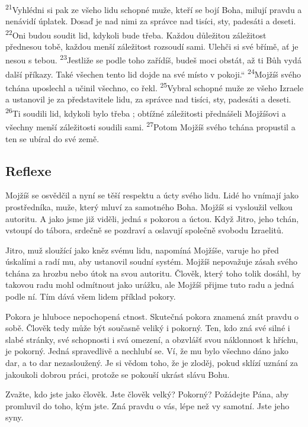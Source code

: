 \documentclass[11pt]{article}
\begin{document}
{\textsuperscript{21}Vyhlédni si pak ze všeho lidu schopné muže, kteří se bojí Boha, milují pravdu a nenávidí úplatek. Dosaď je nad nimi za správce nad tisíci, sty, padesáti a deseti.
\textsuperscript{22}Oni budou soudit lid, kdykoli bude třeba. Každou důležitou záležitost přednesou tobě, každou menší záležitost rozsoudí sami. Ulehči si své břímě, ať je nesou s tebou.
\textsuperscript{23}Jestliže se podle toho zařídíš, budeš moci obstát, až ti Bůh vydá další příkazy. Také všechen tento lid dojde na své místo v pokoji.“
\textsuperscript{24}Mojžíš svého tchána uposlechl a učinil všechno, co řekl.
\textsuperscript{25}Vybral schopné muže ze všeho Izraele a ustanovil je za představitele lidu, za správce nad tisíci, sty, padesáti a deseti.
\textsuperscript{26}Ti soudili lid, kdykoli bylo třeba ; obtížné záležitosti přednášeli Mojžíšovi a všechny menší záležitosti soudili sami.
\textsuperscript{27}Potom Mojžíš svého tchána propustil a ten se ubíral do své země.
}

\subsection*{Reflexe}
Mojžíš se osvědčil a nyní se těší respektu a úcty svého lidu. Lidé ho vnímají jako prostředníka, muže, který
mluví za samotného Boha. Mojžíš si vysloužil velkou autoritu. A jako jsme již viděli, jedná s pokorou a úctou.
Když Jitro, jeho tchán, vstoupí do tábora, srdečně se pozdraví a oslavují společně svobodu Izraelitů.

Jitro, muž sloužící jako kněz svému lidu, napomíná Mojžíše, varuje ho před úskalími a radí mu, aby ustanovil
soudní systém. Mojžíš nepovažuje zásah svého tchána za hrozbu nebo útok na svou autoritu. Člověk, který
toho tolik dosáhl, by takovou radu mohl odmítnout jako urážku, ale Mojžíš přijme tuto radu a jedná podle ní.
Tím dává všem lidem příklad pokory.

Pokora je hluboce nepochopená ctnost. Skutečná pokora znamená znát pravdu o sobě. Člověk tedy může být
současně veliký i pokorný. Ten, kdo zná své silné i slabé stránky, své schopnosti i svá omezení, a obzvlášť
svou náklonnost k hříchu, je pokorný. Jedná spravedlivě a nechlubí se. Ví, že mu bylo všechno dáno jako dar,
a to dar nezasloužený. Je si vědom toho, že je zloděj, pokud sklízí uznání za jakoukoli dobrou práci, protože
se pokouší ukrást slávu Bohu.

Zvažte, kdo jste jako člověk. Jste člověk velký? Pokorný? Požádejte Pána, aby promluvil do toho, kým jste.
Zná pravdu o vás, lépe než vy samotní. Jste jeho syny.
\end{document}
